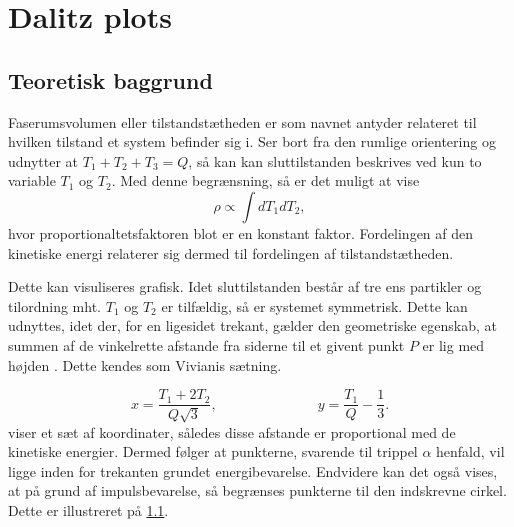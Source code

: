 \chapter{Dalitz plots}
\label{cha:dalitz-plots}

\section{Teoretisk baggrund}
\label{sec:dalitz-teori}

Faserumsvolumen eller tilstandstætheden er som navnet antyder relateret til hvilken tilstand et
system befinder sig i. Ser bort fra den rumlige orientering og udnytter at
$T_{1} + T_{2} + T_{3} = Q$, så kan kan sluttilstanden beskrives ved kun to variable $T_{1}$ og
$T_{2}$. Med denne begrænsning, så er det muligt at vise \cite[s. 120]{Bettini}
\begin{equation}
  \label{eq:DOS}
  \rho \propto \int dT_{1}dT_{2},
\end{equation}
hvor proportionaltetsfaktoren blot er en konstant faktor. Fordelingen af den kinetiske energi
relaterer sig dermed til fordelingen af tilstandstætheden.

Dette kan visuliseres grafisk. Idet sluttilstanden består af tre ens partikler og tilordning
mht. $T_{1}$ og $T_{2}$ er tilfældig, så er systemet symmetrisk. Dette kan udnyttes, idet der, for
en ligesidet trekant, gælder den geometriske egenskab, at summen af de vinkelrette afstande fra
siderne til et givent punkt $P$ er lig med højden \cite{dalitz}. Dette kendes som Vivianis sætning.

\begin{equation}
  \label{eq:dalitz}
  x = \frac{T_{1}+2T_{2}}{Q\sqrt{3}}, \hspace{3cm} y = \frac{T_{1}}{Q} - \frac{1}{3}.
\end{equation}
 viser et sæt af koordinater, således disse afstande er proportional med de
kinetiske energier. Dermed følger at punkterne, svarende til trippel $\alpha$ henfald, vil ligge inden
for trekanten grundet energibevarelse. Endvidere kan det også vises, at på grund af impulsbevarelse,
så begrænses punkterne til den indskrevne cirkel. Dette er illustreret på
\cref{fig:dalitz-triangle}.

\begin{figure}[h]
  \centering
  \caption{}
  \label{fig:dalitz-triangle}
\end{figure}

